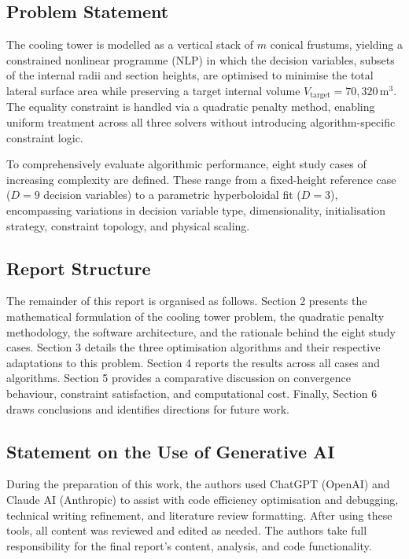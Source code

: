 \subsection{Problem Statement}

The cooling tower is modelled as a vertical stack of $m$ conical frustums, yielding a constrained nonlinear programme (NLP) 
in which the decision variables, subsets of the internal radii and section heights, are optimised to minimise the total lateral surface area while preserving a target 
internal volume $V_{\text{target}} = 70{,}320\,\text{m}^3$. The equality constraint is handled via a quadratic penalty method,
 enabling uniform treatment across all three solvers without introducing algorithm-specific constraint logic.

To comprehensively evaluate algorithmic performance, eight study cases of increasing complexity are defined. These range from a fixed-height reference case ($D = 9$ decision variables) 
to a parametric hyperboloidal fit ($D = 3$), encompassing variations in decision variable type, dimensionality, initialisation strategy, constraint topology, and physical scaling.

\subsection{Report Structure}

The remainder of this report is organised as follows. Section 2 presents the mathematical formulation of the cooling tower problem, 
the quadratic penalty methodology, the software architecture, and the rationale behind the eight study cases. 
Section 3 details the three optimisation algorithms and their respective adaptations to this problem. 
Section 4 reports the results across all cases and algorithms. 
Section 5 provides a comparative discussion on convergence behaviour, constraint satisfaction, and computational cost. Finally, 
Section 6 draws conclusions and identifies directions for future work.

\subsection{Statement on the Use of Generative AI}

During the preparation of this work, the authors used ChatGPT (OpenAI) and Claude AI (Anthropic) to assist with code efficiency optimisation and debugging, 
technical writing refinement, and literature review formatting. 
After using these tools, all content was reviewed and edited as needed. 
The authors take full responsibility for the final report's content, analysis, and code functionality.
